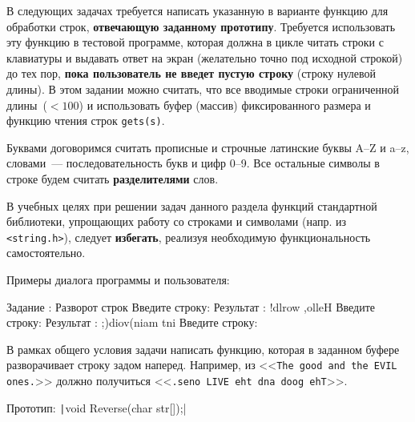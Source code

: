 
В следующих задачах требуется написать указанную в варианте функцию для
обработки строк, \textbf{отвечающую заданному прототипу}. Требуется использовать
эту функцию в тестовой программе, которая должна в цикле читать строки с
клавиатуры и выдавать ответ на экран (желательно точно под исходной строкой)
до тех пор, \textbf{пока пользователь не введет пустую строку} (строку нулевой длины).
В этом задании можно считать, что все вводимые строки ограниченной
длины~($<100$) и использовать буфер (массив) фиксированного размера и
функцию чтения строк \texttt{gets(s)}.

Буквами договоримся считать прописные и строчные латинские буквы 
A--Z и a--z, словами~--- последовательность букв и цифр 0--9. Все остальные
символы в строке будем считать \textbf{разделителями} слов.

В учебных целях при решении задач данного раздела функций стандартной
библиотеки, упрощающих работу со строками и символами (напр. из 
\texttt{<string.h>}), следует \textbf{избегать}, реализуя необходимую
функциональность самостоятельно.

Примеры диалога программы и пользователя:

\begin{zzoutput}
  Задание : Разворот строк
  Введите строку: 
  Результат     : !dlrow ,olleH
  Введите строку: 
  Результат     : ;)diov(niam tni
  Введите строку: \zzuser{ }
\end{zzoutput}


\bigskip


\begin{zztask}
В рамках общего условия задачи написать функцию, которая в заданном буфере
разворачивает строку задом наперед.
Например, из
<<\texttt{The good and the EVIL ones.}>>
должно получиться
<<\texttt{.seno LIVE eht dna doog ehT}>>.

Прототип: \texttt|void Reverse(char str[]);|
\end{zztask}


